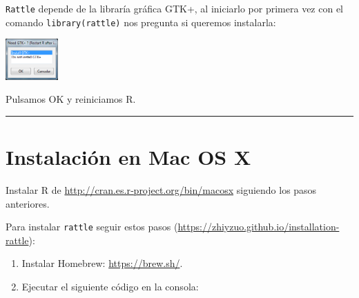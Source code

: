 \documentclass[
]{book}
\newenvironment{Shaded}{\begin{snugshade}}{\end{snugshade}}
\newcommand{\ControlFlowTok}[1]{\textcolor[rgb]{0.13,0.29,0.53}{\textbf{#1}}}
\newcommand{\DataTypeTok}[1]{\textcolor[rgb]{0.13,0.29,0.53}{#1}}
\newcommand{\KeywordTok}[1]{\textcolor[rgb]{0.13,0.29,0.53}{\textbf{#1}}}
\newcommand{\NormalTok}[1]{#1}
\newcommand{\OperatorTok}[1]{\textcolor[rgb]{0.81,0.36,0.00}{\textbf{#1}}}
\newcommand{\StringTok}[1]{\textcolor[rgb]{0.31,0.60,0.02}{#1}}
\begin{document}
\texttt{Rattle} depende de la libraría gráfica GTK+, al iniciarlo por primera vez
con el comando \texttt{library(rattle)} nos pregunta si queremos instalarla:

\includegraphics[width=0.15\textwidth,height=\textheight]{images/image7.png}

Pulsamos OK y reiniciamos R.

\begin{center}\rule{0.5\linewidth}{0.5pt}\end{center}

\hypertarget{instalaciuxf3n-en-mac-os-x}{%
\section{Instalación en Mac OS X}\label{instalaciuxf3n-en-mac-os-x}}

Instalar R de
\url{http://cran.es.r‐project.org/bin/macosx}
siguiendo los pasos anteriores.

Para instalar \texttt{rattle} seguir estos pasos (\url{https://zhiyzuo.github.io/installation-rattle}):

\begin{enumerate}
\def\labelenumi{\arabic{enumi}.}
\item
  Instalar Homebrew:
  \url{https://brew.sh/}.
\item
  Ejecutar el siguiente código en la consola:

\begin{Shaded}
\end{Shaded}
\end{enumerate}
\end{document}
